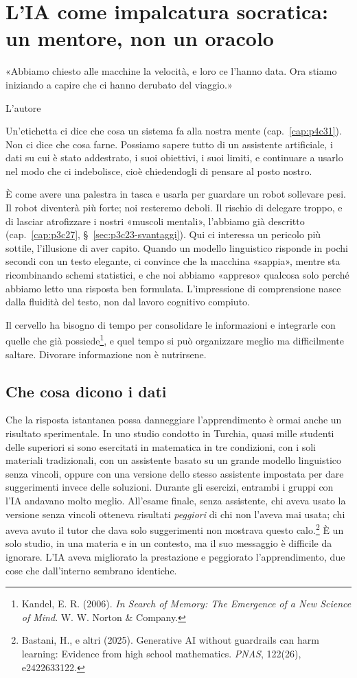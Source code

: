 \chapter{L'IA come impalcatura socratica: un mentore, non un oracolo}
\label{cap:p4c32}

\epigraph{«Abbiamo chiesto alle macchine la velocità, e loro ce l'hanno data. Ora stiamo iniziando a capire che ci hanno derubato del viaggio.»}{L'autore}

Un'etichetta ci dice che cosa un sistema fa alla nostra mente (cap.~\ref{cap:p4c31}). Non ci dice che cosa farne. Possiamo sapere tutto di un assistente artificiale, i dati su cui è stato addestrato, i suoi obiettivi, i suoi limiti, e continuare a usarlo nel modo che ci indebolisce, cioè chiedendogli di pensare al posto nostro.

È come avere una palestra in tasca e usarla per guardare un robot sollevare pesi. Il robot diventerà più forte; noi resteremo deboli. Il rischio di delegare troppo, e di lasciar atrofizzare i nostri «muscoli mentali», l'abbiamo già descritto (cap.~\ref{cap:p3c27}, \S~\ref{sec:p3c23-svantaggi}). Qui ci interessa un pericolo più sottile, l'illusione di aver capito. Quando un modello linguistico risponde in pochi secondi con un testo elegante, ci convince che la macchina «sappia», mentre sta ricombinando schemi statistici, e che noi abbiamo «appreso» qualcosa solo perché abbiamo letto una risposta ben formulata. L'impressione di comprensione nasce dalla fluidità del testo, non dal lavoro cognitivo compiuto.

Il cervello ha bisogno di tempo per consolidare le informazioni e integrarle con quelle che già possiede\footnote{Kandel, E. R. (2006). \textit{In Search of Memory: The Emergence of a New Science of Mind}. W. W. Norton \& Company.}, e quel tempo si può organizzare meglio ma difficilmente saltare. Divorare informazione non è nutrirsene.

\section{Che cosa dicono i dati}

Che la risposta istantanea possa danneggiare l'apprendimento è ormai anche un risultato sperimentale. In uno studio condotto in Turchia, quasi mille studenti delle superiori si sono esercitati in matematica in tre condizioni, con i soli materiali tradizionali, con un assistente basato su un grande modello linguistico senza vincoli, oppure con una versione dello stesso assistente impostata per dare suggerimenti invece delle soluzioni. Durante gli esercizi, entrambi i gruppi con l'IA andavano molto meglio. All'esame finale, senza assistente, chi aveva usato la versione senza vincoli otteneva risultati \textit{peggiori} di chi non l'aveva mai usata; chi aveva avuto il tutor che dava solo suggerimenti non mostrava questo calo.\footnote{Bastani, H., e altri (2025). Generative AI without guardrails can harm learning: Evidence from high school mathematics. \textit{PNAS}, 122(26), e2422633122.} È un solo studio, in una materia e in un contesto, ma il suo messaggio è difficile da ignorare. L'IA aveva migliorato la prestazione e peggiorato l'apprendimento, due cose che dall'interno sembrano identiche.


